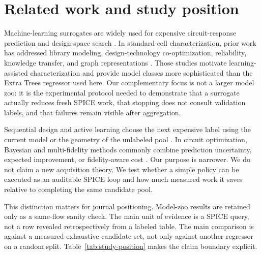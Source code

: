 \documentclass[preprint,12pt]{elsarticle}
\begin{document}
\section{Related work and study position}

Machine-learning surrogates are widely used for expensive circuit-response prediction and design-space search \cite{Fayazi_AI_AMS_Review_2021,Afacan_ML_AnalogRF_Review_2021,Mina_ML_AnalogIC_Review_2022}. In standard-cell characterization, prior work has addressed library modeling, design-technology co-optimization, reliability, knowledge transfer, and graph representations \cite{Klemme_CellLib_ML_DTCO_ICCAD_2020,Klemme_Reliability_CellLib_TCASI_2021,Tang_KnowledgeTransfer_CellLib_MEJO_2025,Ma_GNN_CellLib_Integration_2025}. Those studies motivate learning-assisted characterization and provide model classes more sophisticated than the Extra Trees regressor used here. Our complementary focus is not a larger model zoo: it is the experimental protocol needed to demonstrate that a surrogate actually reduces fresh SPICE work, that stopping does not consult validation labels, and that failures remain visible after aggregation.

Sequential design and active learning choose the next expensive label using the current model or the geometry of the unlabeled pool \cite{Settles_ActiveLearning_2009}. In circuit optimization, Bayesian and multi-fidelity methods commonly combine prediction uncertainty, expected improvement, or fidelity-aware cost \cite{Lyu_Bayesian_Analog_2018,Zhang_MultiFidelity_BO_DAC_2019,He_Batched_MultiFidelity_BO_TCAD_2023}. Our purpose is narrower. We do not claim a new acquisition theory. We test whether a simple policy can be executed as an auditable SPICE loop and how much measured work it saves relative to completing the same candidate pool.

This distinction matters for journal positioning. Model-zoo results are retained only as a same-flow sanity check. The main unit of evidence is a SPICE query, not a row revealed retrospectively from a labeled table. The main comparison is against a measured exhaustive candidate set, not only against another regressor on a random split. Table~\ref{tab:study-position} makes the claim boundary explicit.
\end{document}
